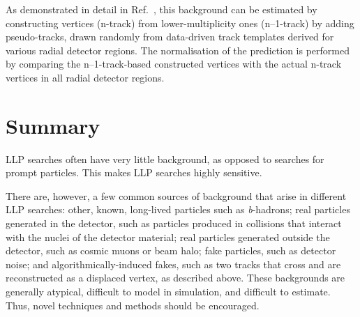 As demonstrated in detail in Ref.~\cite{Aaboud:2017iio,Aad:2015rba}, this background can be estimated by constructing vertices (n-track) from lower-multiplicity ones (n--1-track) by adding pseudo-tracks, drawn randomly from data-driven track templates derived for various radial detector regions. The normalisation of the prediction is performed by comparing the n--1-track-based constructed vertices with the actual n-track vertices in all radial detector regions.

\section{Summary} %

LLP searches often have very little background, as opposed to searches for prompt particles. This makes LLP searches highly sensitive.

There are, however, a few common sources of background that arise in different LLP searches: other, known, long-lived particles such as \textit{b}-hadrons; real particles generated in the detector, such as particles produced in collisions that interact with the nuclei of the detector material; real particles generated outside the detector, such as cosmic muons or beam halo; fake particles, such as detector noise; and algorithmically-induced fakes, such as two tracks that cross and are reconstructed as a displaced vertex, as described above. These backgrounds are generally atypical, difficult to model in simulation, and difficult to estimate. Thus, novel techniques and methods should be encouraged.
